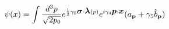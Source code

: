 \begin{equation}
\psi (x) = \int \frac{d^{3} p}{\sqrt{2 p_{0}}} e^{\frac{1}{2} \gamma_{5} 
\mbox{\boldmath $\sigma$} \cdot \mbox{\boldmath $ \lambda$}(p)} e^{i \gamma_{4} \mbox{\boldmath$p$} \cdot \mbox{\boldmath$x$}} (a_{{\bf p}} + \gamma_{5} \hat{b}_{{\bf p}}) 
\end{equation}

